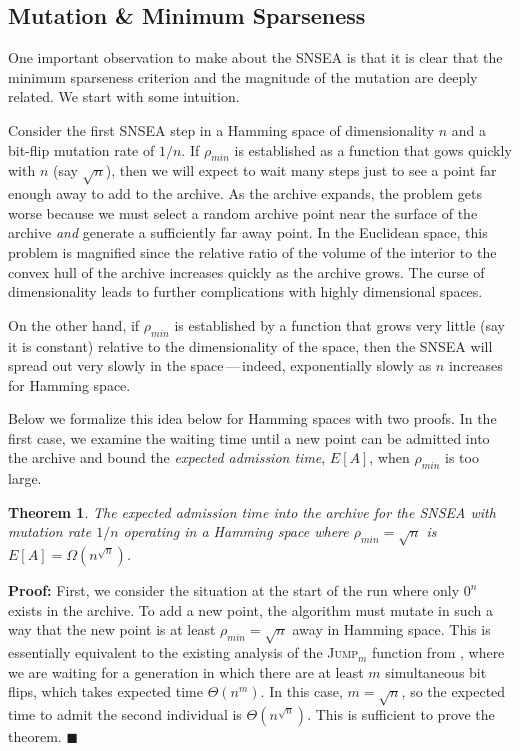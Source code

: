 \documentclass[twoside]{article}
\newtheorem{theorem}{Theorem}
\begin{document}
\subsection{Mutation \& Minimum Sparseness}
\label{subsec:mutation}
One important observation to make about the SNSEA is that it is clear that the minimum sparseness criterion and the magnitude of the mutation are deeply related.  We start with some intuition.

Consider the first SNSEA step in a Hamming space of dimensionality $n$ and a bit-flip mutation rate of $1/n$.  If $\rho_{min}$ is established as a function that gows quickly with $n$ (say $\sqrt{n}$), then we will expect to wait many steps just to see a point far enough away to add to the archive.  As the archive expands, the problem gets worse because we must select a random archive point near the surface of the archive \emph{and} generate a sufficiently far away point.  In the Euclidean space, this problem is magnified since the relative ratio of the volume of the interior to the convex hull of the archive increases quickly as the archive grows.  The curse of dimensionality leads to further complications with highly dimensional spaces.

On the other hand, if $\rho_{min}$ is established by a function that grows very little (say it is constant) relative to the dimensionality of the space, then the SNSEA will spread out very slowly in the space\,---\,indeed, exponentially slowly as $n$ increases for Hamming space.  

Below we formalize this idea below for Hamming spaces with two proofs.  In the first case, we examine the waiting time until a new point can be admitted into the archive and bound the \emph{expected admission time}, $E[A]$, when $\rho_{min}$ is too large.  

\begin{theorem}
The expected admission time into the archive for the SNSEA with mutation rate $1/n$ operating in a Hamming space where $\rho_{min} = \sqrt{n}$ is $E[A] = \Omega(n^{\sqrt{n}})$.
\end{theorem}
\textbf{Proof:} First, we consider the situation at the start of the run where only $0^n$ exists in the archive.  To add a new point, the algorithm must mutate in such a way that the new point is at least $\rho_{min} = \sqrt{n}$ away in Hamming space.  This is essentially equivalent to the existing analysis of the \textsc{Jump}$_m$ function from \cite{Droste1998tr}, where we are waiting for a generation in which there are at least $m$ simultaneous bit flips, which takes expected time $\Theta(n^m)$.  In this case, $m = \sqrt{n}$, so the expected time to admit the second individual is $\Theta(n^{\sqrt{n}})$.  This is sufficient to prove the theorem. $\blacksquare$
\end{document}
